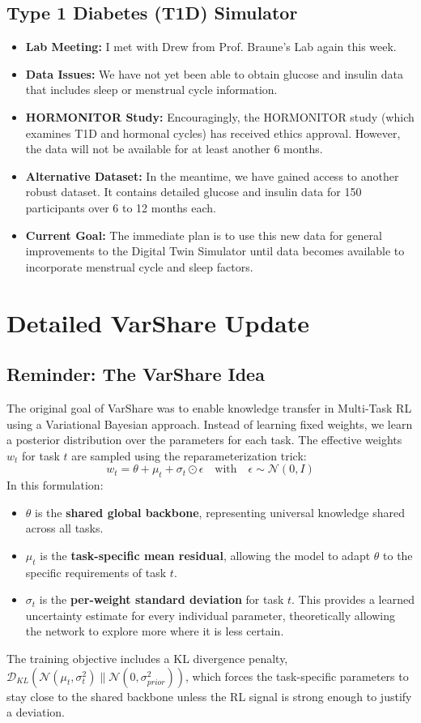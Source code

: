 \documentclass[11pt,a4paper]{article}
\begin{document}
\subsection*{Type 1 Diabetes (T1D) Simulator}
\begin{itemize}
    \item \textbf{Lab Meeting:} I met with Drew from Prof. Braune's Lab again this week.
    \item \textbf{Data Issues:} We have not yet been able to obtain glucose and insulin data that includes sleep or menstrual cycle information.
    \item \textbf{HORMONITOR Study:} Encouragingly, the HORMONITOR study (which examines T1D and hormonal cycles) has received ethics approval. However, the data will not be available for at least another 6 months.
    \item \textbf{Alternative Dataset:} In the meantime, we have gained access to another robust dataset. It contains detailed glucose and insulin data for 150 participants over 6 to 12 months each.
    \item \textbf{Current Goal:} The immediate plan is to use this new data for general improvements to the Digital Twin Simulator until data becomes available to incorporate menstrual cycle and sleep factors.
\end{itemize}

\section{Detailed VarShare Update}

\subsection{Reminder: The VarShare Idea}
The original goal of VarShare was to enable knowledge transfer in Multi-Task RL using a Variational Bayesian approach. Instead of learning fixed weights, we learn a posterior distribution over the parameters for each task. The effective weights $w_t$ for task $t$ are sampled using the reparameterization trick:
\[ w_t = \theta + \mu_t + \sigma_t \odot \epsilon \quad \text{with} \quad \epsilon \sim \mathcal{N}(0, I) \]
In this formulation:
\begin{itemize}
    \item $\theta$ is the \textbf{shared global backbone}, representing universal knowledge shared across all tasks.
    \item $\mu_t$ is the \textbf{task-specific mean residual}, allowing the model to adapt $\theta$ to the specific requirements of task $t$.
    \item $\sigma_t$ is the \textbf{per-weight standard deviation} for task $t$. This provides a learned uncertainty estimate for every individual parameter, theoretically allowing the network to explore more where it is less certain.
\end{itemize}
The training objective includes a KL divergence penalty, $\mathcal{D}_{KL}( \mathcal{N}(\mu_t, \sigma_t^2) \| \mathcal{N}(0, \sigma_{prior}^2) )$, which forces the task-specific parameters to stay close to the shared backbone unless the RL signal is strong enough to justify a deviation.
\end{document}
